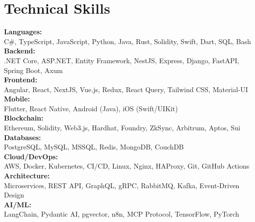 \section{Technical Skills}
 \begin{itemize}[leftmargin=0.15in, label={}]
    \small{\item{
     \textbf{Languages:} \\
     \quad \textbullet{} C\#, TypeScript, JavaScript, Python, Java, Rust, Solidity, Swift, Dart, SQL, Bash \\ \vspace{2pt}
     \textbf{Backend:} \\
     \quad \textbullet{} .NET Core, ASP.NET, Entity Framework, NestJS, Express, Django, FastAPI, Spring Boot, Axum \\ \vspace{2pt}
     \textbf{Frontend:} \\
     \quad \textbullet{} Angular, React, NextJS, Vue.js, Redux, React Query, Tailwind CSS, Material-UI \\ \vspace{2pt}
     \textbf{Mobile:} \\
     \quad \textbullet{} Flutter, React Native, Android (Java), iOS (Swift/UIKit) \\ \vspace{2pt}
     \textbf{Blockchain:} \\
     \quad \textbullet{} Ethereum, Solidity, Web3.js, Hardhat, Foundry, ZkSync, Arbitrum, Aptos, Sui \\ \vspace{2pt}
     \textbf{Databases:} \\
     \quad \textbullet{} PostgreSQL, MySQL, MSSQL, Redis, MongoDB, CouchDB \\ \vspace{2pt}
     \textbf{Cloud/DevOps:} \\
     \quad \textbullet{} AWS, Docker, Kubernetes, CI/CD, Linux, Nginx, HAProxy, Git, GitHub Actions \\ \vspace{2pt}
     \textbf{Architecture:} \\
     \quad \textbullet{} Microservices, REST API, GraphQL, gRPC, RabbitMQ, Kafka, Event-Driven Design \\ \vspace{2pt}
     \textbf{AI/ML:} \\
     \quad \textbullet{} LangChain, Pydantic AI, pgvector, n8n, MCP Protocol, TensorFlow, PyTorch \\ \vspace{2pt}
}}
\end{itemize}

